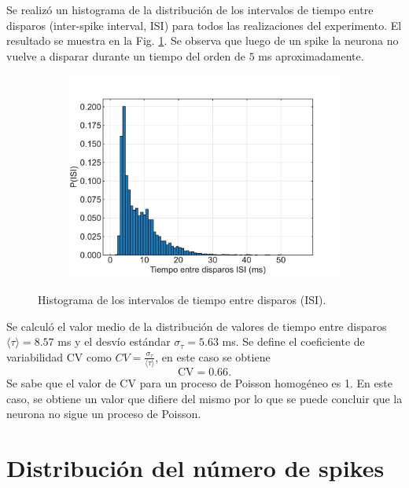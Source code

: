 \documentclass[11pt,twocolumn,twoside]{opticajnl}
\begin{document}
Se realizó un histograma de la distribución de los intervalos de tiempo
entre disparos (inter-spike interval, ISI) para todos las realizaciones del experimento. El resultado se muestra en la Fig. \ref{fig:histISI}. Se observa que luego de un spike la neurona no vuelve a disparar durante un tiempo del orden de $5$ ms aproximadamente.
\begin{figure}[H]
    \centering
         \begin{subfigure}[H]{\linewidth}
            \includegraphics[width=\textwidth]{Figuras/histograma_ISI.pdf}
         \end{subfigure}
    \caption{Histograma de los intervalos de tiempo entre disparos (ISI).} 
    \label{fig:histISI}
\end{figure}
\newpage
Se calculó el valor medio de la distribución de valores de tiempo entre disparos $\langle \tau \rangle = 8.57$ ms y el desvío estándar $\sigma_\tau = 5.63$ ms. Se define el coeficiente de variabilidad CV como $CV = \frac{\sigma_\tau}{\langle \tau \rangle}$, en este caso se obtiene
\begin{equation}
    \text{CV} = 0.66.
\end{equation}
Se sabe que el valor de CV para un proceso de Poisson homogéneo es 1. En este caso, se obtiene un valor que difiere del mismo por lo que se puede concluir que la neurona no sigue un proceso de Poisson.


\section{Distribución del número de spikes}
\end{document}
